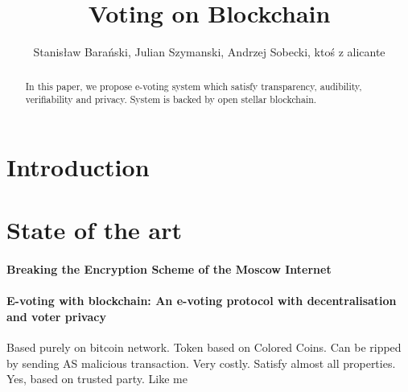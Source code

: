 \documentclass[runningheads]{llncs}
\begin{document}
%
\title{Voting on Blockchain}
%
%
\author{Stanisław Barański, Julian Szymanski, Andrzej Sobecki, ktoś z alicante}

%
%
\maketitle              %
%
\begin{abstract}
In this paper, we propose e-voting system which satisfy transparency, audibility, verifiability and privacy. System is backed by open stellar blockchain.


\end{abstract}


\section{Introduction}


\section{State of the art}

\paragraph{Breaking the Encryption Scheme of the Moscow Internet ~\cite{gaudry2019breaking} }

\paragraph{E-voting with blockchain: An e-voting protocol with decentralisation and voter privacy ~\cite{hardwick2018voting} }
Based purely on bitcoin network. Token based on Colored Coins. Can be ripped by sending AS malicious transaction. Very costly. Satisfy almost all properties. Yes, based on trusted party. Like me
\end{document}
